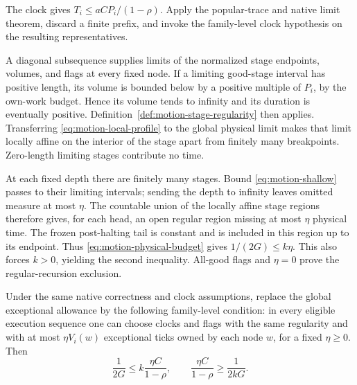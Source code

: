\begin{proofoutline}
The clock gives $T_i\le aCP_i/(1-\rho)$.  Apply the popular-trace and native
limit theorem, discard a finite prefix, and invoke the family-level clock
hypothesis on the resulting representatives.

A diagonal subsequence supplies limits of the normalized stage endpoints,
volumes, and flags at every fixed node.  If a limiting good-stage interval
has positive length, its volume is bounded below by a positive multiple of
$P_i$, by the own-work budget.  Hence its volume tends to infinity and its
duration is eventually positive.  Definition~\ref{def:motion-stage-regularity}
then applies.  Transferring \eqref{eq:motion-local-profile} to the global
physical limit makes that limit locally affine on the interior of the stage
apart from finitely many breakpoints.  Zero-length limiting stages contribute
no time.

At each fixed depth there are finitely many stages.  Bound
\eqref{eq:motion-shallow} passes to their limiting intervals; sending the
depth to infinity leaves omitted measure at most $\eta$.  The countable union
of the locally affine stage regions therefore gives, for each head, an open
regular region missing at most $\eta$ physical time.  The frozen post-halting
tail is constant and is included in this region up to its endpoint.  Thus
\eqref{eq:motion-physical-budget} gives $1/(2G)\le k\eta$.
This also forces $k>0$, yielding the second inequality.  All-good flags and
$\eta=0$ prove the regular-recursion exclusion.
\end{proofoutline}

\begin{corollary}
\label{cor:motion-node-exception}
Under the same native correctness and clock assumptions, replace the global
exceptional allowance by the following family-level condition: in every
eligible execution sequence one can choose clocks and flags with the same
regularity and with at most $\eta V_i(w)$ exceptional ticks owned by each node
$w$, for a fixed $\eta\ge0$.  Then
\[
 \frac1{2G}\le k\frac{\eta C}{1-\rho},\qquad
 \frac{\eta C}{1-\rho}\ge\frac1{2kG}.
\]
\end{corollary}

